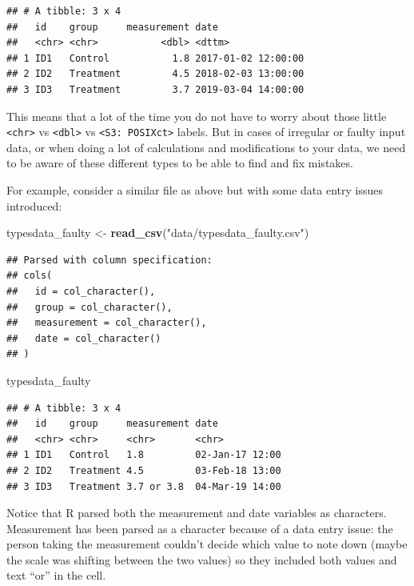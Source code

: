 \documentclass[
  12pt,
  krantz2]{krantz}
\makeatletter
\newenvironment{Shaded}{\begin{snugshade}}{\end{snugshade}}
\newcommand{\KeywordTok}[1]{\textcolor[rgb]{0.13,0.29,0.53}{\textbf{#1}}}
\newcommand{\NormalTok}[1]{#1}
\newcommand{\StringTok}[1]{\textcolor[rgb]{0.31,0.60,0.02}{#1}}
\newenvironment{kframe}{%
\medskip{}
\setlength{\fboxsep}{.8em}
 \def\at@end@of@kframe{}%
 \ifinner\ifhmode%
  \def\at@end@of@kframe{\end{minipage}}%
  \begin{minipage}{\columnwidth}%
 \fi\fi%
 \def\FrameCommand##1{\hskip\@totalleftmargin \hskip-\fboxsep
 \colorbox{shadecolor}{##1}\hskip-\fboxsep
     \hskip-\linewidth \hskip-\@totalleftmargin \hskip\columnwidth}%
 \MakeFramed {\advance\hsize-\width
   \@totalleftmargin\z@ \linewidth\hsize
   \@setminipage}}%
 {\par\unskip\endMakeFramed%
 \at@end@of@kframe}
\renewenvironment{Shaded}{\begin{kframe}}{\end{kframe}}
\makeatother
\begin{document}
\begin{verbatim}
## # A tibble: 3 x 4
##   id    group     measurement date               
##   <chr> <chr>           <dbl> <dttm>             
## 1 ID1   Control           1.8 2017-01-02 12:00:00
## 2 ID2   Treatment         4.5 2018-02-03 13:00:00
## 3 ID3   Treatment         3.7 2019-03-04 14:00:00
\end{verbatim}

This means that a lot of the time you do not have to worry about those little \texttt{\textless{}chr\textgreater{}} vs \texttt{\textless{}dbl\textgreater{}} vs \texttt{\textless{}S3:\ POSIXct\textgreater{}} labels.
But in cases of irregular or faulty input data, or when doing a lot of calculations and modifications to your data, we need to be aware of these different types to be able to find and fix mistakes.

For example, consider a similar file as above but with some data entry issues introduced:

\begin{Shaded}
\begin{Highlighting}[]
\NormalTok{typesdata_faulty <-}\StringTok{ }\KeywordTok{read_csv}\NormalTok{(}\StringTok{"data/typesdata_faulty.csv"}\NormalTok{)}
\end{Highlighting}
\end{Shaded}

\begin{verbatim}
## Parsed with column specification:
## cols(
##   id = col_character(),
##   group = col_character(),
##   measurement = col_character(),
##   date = col_character()
## )
\end{verbatim}

\begin{Shaded}
\begin{Highlighting}[]
\NormalTok{typesdata_faulty}
\end{Highlighting}
\end{Shaded}

\begin{verbatim}
## # A tibble: 3 x 4
##   id    group     measurement date           
##   <chr> <chr>     <chr>       <chr>          
## 1 ID1   Control   1.8         02-Jan-17 12:00
## 2 ID2   Treatment 4.5         03-Feb-18 13:00
## 3 ID3   Treatment 3.7 or 3.8  04-Mar-19 14:00
\end{verbatim}

Notice that R parsed both the measurement and date variables as characters.
Measurement has been parsed as a character because of a data entry issue: the person taking the measurement couldn't decide which value to note down (maybe the scale was shifting between the two values) so they included both values and text ``or'' in the cell.
\end{document}
